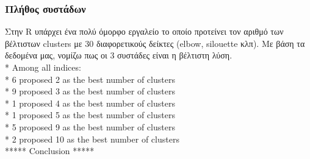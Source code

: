 \documentclass[a4paper,twoside,10pt]{article}
\begin{document}
\subsubsection{Πλήθος συστάδων}
	Στην R υπάρχει ένα πολύ όμορφο εργαλείο το οποίο προτείνει τον αριθμό των βέλτιστων clusters με 30 διαφορετικούς δείκτες (elbow, silouette κλπ).
	Με βάση τα δεδομένα μας, νομίζω πως οι 3 συστάδες είναι η βέλτιστη λύση.\\
	* Among all indices:\\
	* 6 proposed 2 as the best number of clusters\\
	* 9 proposed 3 as the best number of clusters\\
	* 1 proposed 4 as the best number of clusters \\
	* 1 proposed 5 as the best number of clusters\\
	* 5 proposed 9 as the best number of clusters\\
	* 2 proposed 10 as the best number of clusters\\
	
	***** Conclusion *****\\
	
\end{document}
